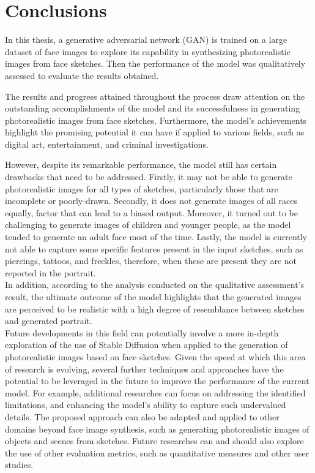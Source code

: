 \newpage
\section{Conclusions}
\label{sec:conclusion}
In this thesis, a generative adversarial network (GAN) is trained on a large dataset of face images to explore its capability in synthesizing photorealistic images from face sketches. Then the performance of the model was qualitatively assessed to evaluate the results obtained.

\noindent The results and progress attained throughout the process draw attention on the outstanding accomplishments of the model and its successfulness in generating photorealistic images from face sketches. Furthermore, the model’s achievements highlight the promising potential it can have if applied to various fields, such as digital art, entertainment, and criminal investigations.

\noindent However, despite its remarkable performance, the model still has certain drawbacks that need to be addressed. Firstly, it may not be able to generate photorealistic images for all types of sketches, particularly those that are incomplete or poorly-drawn. Secondly, it does not generate images of all races equally, factor that can lead to a biased output. Moreover, it turned out to be challenging to generate images of children and younger people, as the model tended to generate an adult face most of the time. Lastly, the model is currently not able to capture some specific features present in the input sketches, such as piercings, tattoos, and freckles, therefore, when these are present they are not reported in the portrait.\\

\noindent In addition, according to the analysis conducted on the qualitative assessment’s result, the ultimate outcome of the model highlights that the generated images are perceived to be realistic with a high degree of resemblance between sketches and generated portrait.\\

\noindent Future developments in this field can potentially involve a more in-depth exploration of the use of Stable Diffusion when applied to the generation of photorealistic images based on face sketches. Given the speed at which this area of research is evolving, several further techniques and approaches have the potential to be leveraged in the future to improve the performance of the current model. For example, additional researches can focus on addressing the identified limitations, and enhancing the model's ability to capture such undervalued details. The proposed approach can also be adapted and applied to other domains beyond face image synthesis, such as generating photorealistic images of objects and scenes from sketches.
Future researches can and should also explore the use of other evaluation metrics, such as quantitative measures and other user studies.\\

